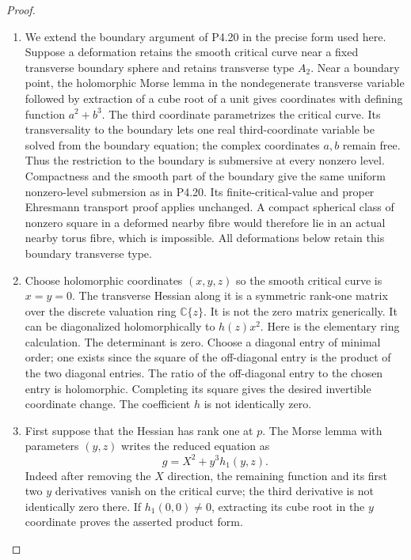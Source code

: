 \begin{proof}

\begin{enumerate}[label={$\langle1\rangle$\arabic*.},leftmargin=*]
\item We extend the boundary argument of P4.20 in the
precise form used here. Suppose a deformation retains
the smooth critical curve near a fixed transverse
boundary sphere and retains transverse type $A_2$.
Near a boundary point, the holomorphic Morse lemma
in the nondegenerate transverse variable followed
by extraction of a cube root of a unit gives
coordinates with defining function $a^2+b^3$.
The third coordinate parametrizes the critical
curve. Its transversality to the boundary lets
one real third-coordinate variable be solved
from the boundary equation; the complex
coordinates $a,b$ remain free. Thus the
restriction to the boundary is submersive
at every nonzero level. Compactness and
the smooth part of the boundary give the
same uniform nonzero-level submersion as
in P4.20. Its finite-critical-value and
proper Ehresmann transport proof applies
unchanged. A compact spherical class of
nonzero square in a deformed nearby
fibre would therefore lie in an actual
nearby torus fibre, which is impossible.
All deformations below retain this
boundary transverse type.

\item Choose holomorphic coordinates $(x,y,z)$
so the smooth critical curve is $x=y=0$.
The transverse Hessian along it is a
symmetric rank-one matrix over the
discrete valuation ring $\mathbb C\{z\}$.
It is not the zero matrix generically.
It can be diagonalized holomorphically
to $h(z)x^2$. Here is the elementary
ring calculation. The determinant is
zero. Choose a diagonal entry of
minimal order; one exists since the
square of the off-diagonal entry is
the product of the two diagonal entries.
The ratio of the off-diagonal entry
to the chosen entry is holomorphic.
Completing its square gives the desired
invertible coordinate change. The
coefficient $h$ is not identically zero.

\item First suppose that the Hessian has
rank one at $p$. The Morse lemma with
parameters $(y,z)$ writes the reduced
equation as
\[
 g=X^2+y^3h_1(y,z).
\]
Indeed after removing the $X$ direction,
the remaining function and its first
two $y$ derivatives vanish on the
critical curve; the third derivative
is not identically zero there. If
$h_1(0,0)\ne0$, extracting its cube
root in the $y$ coordinate proves the
asserted product form.


\end{enumerate}
\end{proof}
